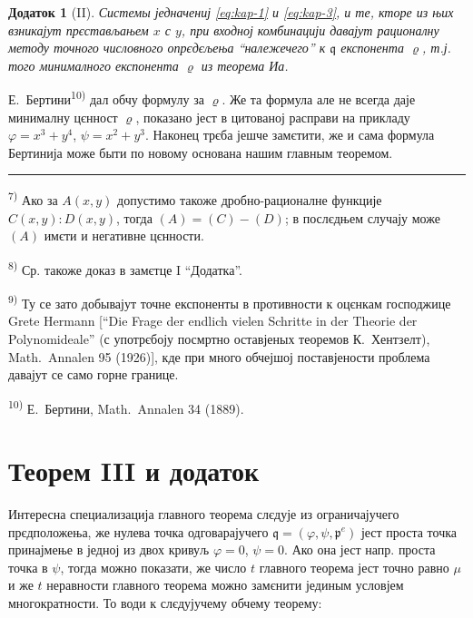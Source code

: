 \documentclass[11pt]{article}
\newcommand{\foreign}[1]{#1}
\theoremstyle{plain}
\newtheorem{zusatz}{Додаток}
\begin{document}
\begin{zusatz}[II]
Системы једначениј \eqref{eq:kap-1} и \eqref{eq:kap-3}, и те, кторе
из њих взникајут прєстављањем $x$ с $y$, при входној комбинацији
давајут рационалну методу точного числовного опрєдєљења
``належечего'' к $\mathfrak{q}$ експонента
$\varrho$, т.ј. того минималного експонента $\varrho$ из теорема Иа.
\end{zusatz}

Е.\ Бертини\textsuperscript{10)} дал обчу формулу за $\varrho$.
Же та формула але не всегда даје минималну цєнност $\varrho$,
показано јест в цитованој расправи на прикладу
$\varphi = x^{3} + y^{4}$, $\psi = x^{2} + y^{3}$. Наконец трєба
јешче замєтити, же и сама формула Бертинија може быти по новому
основана нашим главным теоремом.

\vspace{0.5em}
\noindent\rule{\textwidth}{0.4pt}
\vspace{0.3em}

{\footnotesize
\textsuperscript{7)} Ако за $A(x,y)$ допустимо такоже дробно-рационалне
функције $C(x,y):D(x,y)$, тогда $(A) = (C) - (D)$; в послєдњем
случају може $(A)$ имєти и негативне цєнности.

\textsuperscript{8)} Ср. такоже доказ в замєтце I ``Додатка''.

\textsuperscript{9)} Ту се зато добывајут точне експоненты в противности к
оцєнкам господжице Grete Hermann [``\foreign{Die Frage der endlich vielen Schritte
in der Theorie der Polynomideale}'' (с употрєбоју посмртно оставјеных
теоремов К.\ Хентзелт), \foreign{Math.\ Annalen} 95 (1926)], кде при
много обчејшој поставјености проблема давајут се само горне границе.

\textsuperscript{10)} Е.\ Бертини, \foreign{Math.\ Annalen} 34 (1889).
}

\newpage
\section*{Теорем III и додаток}

Интересна специализација главного теорема слєдује из ограничајучего
прєдположења, же нулева точка одговарајучего
$\mathfrak{q} = (\varphi, \psi, \mathfrak{p}^{e})$ јест проста
точка принајмење в једној из двох кривуљ $\varphi = 0$, $\psi = 0$.
Ако она јест напр. проста точка в $\psi$, тогда можно показати, же
число $t$ главного теорема јест точно равно $\mu$ и же $t$
неравности главного теорема можно замєнити јединым условјем
многократности. То води к слєдујучему обчему теорему:
\end{document}
